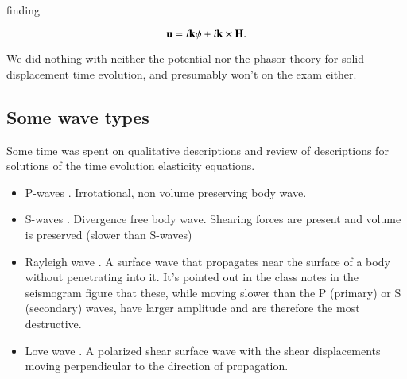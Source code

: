 finding

\begin{equation}\label{eqn:continuumElasticityReview:810}
\mathbf{u} = i \mathbf{k} \phi + i \mathbf{k} \times \mathbf{H}.
\end{equation}

We did nothing with neither the potential nor the phasor theory for solid displacement time evolution, and presumably won't on the exam either.

\subsection{Some wave types}

Some time was spent on qualitative descriptions and review of descriptions for solutions of the time evolution elasticity equations.

\begin{itemize}
\item P-waves \citep{wiki:pwave}.  Irrotational, non volume preserving body wave.
\item S-waves \citep{wiki:swave}.  Divergence free body wave.  Shearing forces are present and volume is preserved (slower than S-waves)
\item Rayleigh wave \citep{wiki:rayleighwave}.  A surface wave that propagates near the surface of a body without penetrating into it.  It's pointed out in the class notes in the seismogram figure that these, while moving slower than the P (primary) or S (secondary) waves, have larger amplitude and are therefore the most destructive.
\item Love wave \citep{wiki:lovewave}.  A polarized shear surface wave with the shear displacements moving perpendicular to the direction of propagation.
\end{itemize}

